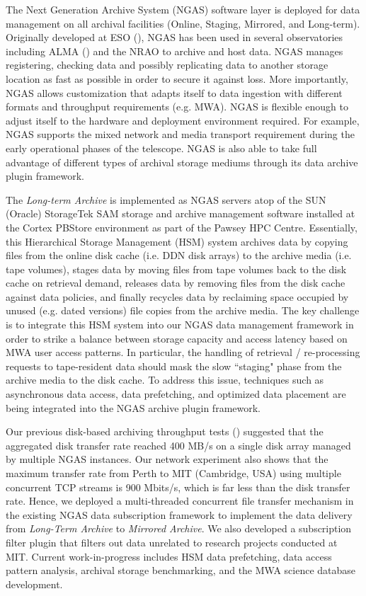 \documentclass[11pt,twoside]{article}
\begin{document}
The Next Generation Archive System (NGAS) software layer is deployed for data management on all archival facilities (Online, Staging, Mirrored, and Long-term). Originally developed at ESO (\cite{wicenec2007eso}), NGAS has been used in several observatories including ALMA (\cite{wicenec2004alma}) and the NRAO to archive and host data. NGAS manages registering, checking data and possibly replicating data to another storage location as fast as possible in order to secure it against loss. More importantly, NGAS allows customization that adapts itself to data ingestion with different formats and throughput requirements (e.g. MWA). NGAS is flexible enough to adjust itself to the hardware and deployment environment required. For example, NGAS supports the mixed network and media transport requirement during the early operational phases of the telescope. NGAS is also able to take full advantage of different types of archival storage mediums through its data archive plugin framework.

The \emph{Long-term Archive} is implemented as NGAS servers atop of the SUN (Oracle) StorageTek SAM storage and archive management software installed at the Cortex PBStore environment as part of the Pawsey HPC Centre. Essentially, this Hierarchical Storage Management (HSM) system archives data by copying files from the online disk cache (i.e. DDN disk arrays) to the archive media (i.e. tape volumes), stages data by moving files from tape volumes back to the disk cache on retrieval demand, releases data by removing files from the disk cache against data policies, and finally recycles data by reclaiming space occupied by unused (e.g. dated versions) file copies from the archive media. The key challenge is to integrate this HSM system into our NGAS data management framework in order to strike a balance between storage capacity and access latency based on MWA user access patterns. In particular, the handling of retrieval / re-processing requests to tape-resident data should mask the slow ``staging" phase from the archive media to the disk cache. To address this issue, techniques such as asynchronous data access, data prefetching, and optimized data placement are being integrated into the NGAS archive plugin framework.  

Our previous disk-based archiving throughput tests (\cite{wiceneca2012mwa}) suggested that the aggregated disk transfer rate reached 400 MB/s on a single disk array managed by multiple NGAS instances. Our network experiment also shows that the maximum transfer rate from Perth to MIT (Cambridge, USA) using multiple concurrent TCP streams is 900 Mbits/s, which is far less than the disk transfer rate. Hence, we deployed a multi-threaded concurrent file transfer mechanism in the existing NGAS data subscription framework to implement the data delivery from \emph{Long-Term Archive} to \emph{Mirrored Archive}. We also developed a subscription filter plugin that filters out data unrelated to research projects conducted at MIT. Current work-in-progress includes HSM data prefetching, data access pattern analysis, archival storage benchmarking, and the MWA science database development.



\end{document}
